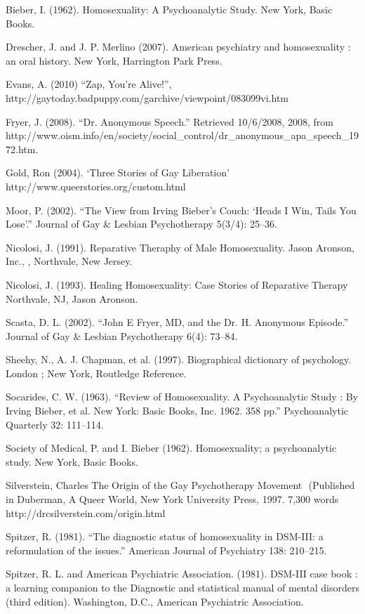 Bieber, I. (1962). Homosexuality: A Psychoanalytic Study. New York, Basic Books.

Drescher, J. and J. P. Merlino (2007). American psychiatry and homosexuality : an oral history. New York, Harrington Park Press.

Evans, A. (2010) ``Zap, You're Alive!'', http:\slash \slash gaytoday.badpuppy.com\slash garchive\slash viewpoint\slash 083099vi.htm

Fryer, J. (2008). ``Dr. Anonymous Speech.'' Retrieved 10\slash 6\slash 2008, 2008, from http:\slash \slash www.oism.info\slash en\slash society\slash social\_control\slash dr\_anonymous\_apa\_speech\_1972.htm.

Gold, Ron (2004). `Three Stories of Gay Liberation' http:\slash \slash www.queerstories.org\slash custom.html

Moor, P. (2002). ``The View from Irving Bieber's Couch: `Heads I Win, Tails You Lose'.'' Journal of Gay \& Lesbian Psychotherapy 5(3\slash 4): 25--36.

Nicolosi, J. (1991). Reparative Theraphy of Male Homosexuality. Jason Aronson, Inc., , Northvale, New Jersey.

Nicolosi, J. (1993). Healing Homosexuality: Case Stories of Reparative Therapy Northvale, NJ, Jason Aronson.

Scasta, D. L. (2002). ``John E Fryer, MD, and the Dr. H. Anonymous Episode.'' Journal of Gay \& Lesbian Psychotherapy 6(4): 73--84.

Sheehy, N., A. J. Chapman, et al. (1997). Biographical dictionary of psychology. London ; New York, Routledge Reference.

Socarides, C. W. (1963). ``Review of Homosexuality. A Psychoanalytic Study : By Irving Bieber, et al. New York: Basic Books, Inc. 1962. 358 pp.'' Psychoanalytic Quarterly 32: 111--114.

Society of Medical, P. and I. Bieber (1962). Homosexuality; a psychoanalytic study. New York, Basic Books.

Silverstein, Charles The Origin of the Gay Psychotherapy Movement
 (Published in Duberman, A Queer World, New York University Press, 1997. 7,300 words http:\slash \slash drcsilverstein.com\slash origin.html

Spitzer, R. (1981). ``The diagnostic status of homosexuality in DSM-III: a reformulation of the issues.'' American Journal of Psychiatry 138: 210--215.

Spitzer, R. L. and American Psychiatric Association. (1981). DSM-III case book : a learning companion to the Diagnostic and statistical manual of mental disorders (third edition). Washington, D.C., American Psychiatric Association.

